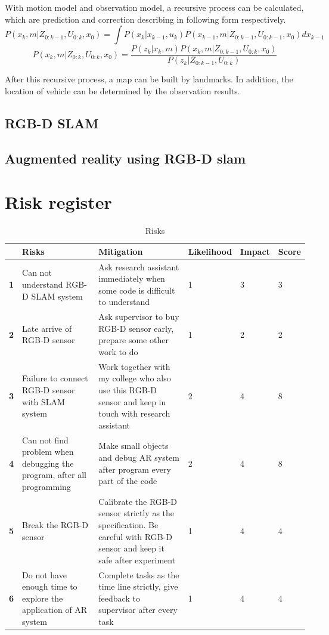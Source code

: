 \documentclass[a4paper,11pt]{article}
\begin{document}
With motion model and observation model, a recursive process can be calculated, which are prediction and correction describing in following form respectively.
\begin{equation}
P(x_k,m | Z_{0:k-1}, U_{0:k}, x_0)=\int P(x_k | x_{k-1}, u_k)P(x_{k-1},m | Z_{0:k-1}, U_{0:k-1}, x_0)dx_{k-1}
\end{equation}
\begin{equation}
P(x_k,m | Z_{0:k}, U_{0:k}, x_0)=\frac{P(z_k | x_k, m)P(x_k,m | Z_{0:k-1}, U_{0:k}, x_0)}{P(z_k | Z_{0:k-1}, U_{0:k})}
\end{equation}

After this recursive process, a map can be built by landmarks. In addition, the location of vehicle can be determined by the observation results.

\subsection{RGB-D SLAM}


\subsection{Augmented reality using RGB-D slam}


\section{Risk register}


\begin{table}[!htp]
\caption{\label{tab:widgets}Risks}
\centering
\begin{tabular}{ | p{0.5cm}| p{4.5cm}|p{4cm} | p{1.9cm}| p{1.2cm} | p{1.2cm} | }

\hline
 &\textbf{Risks}&\textbf{Mitigation}&\textbf{Likelihood}&\textbf{Impact}&\textbf{Score}\\ 
\hline
\textbf{1}&Can not understand RGB-D SLAM system&Ask research assistant immediately when some code is difficult to understand&1&3&3\\ 
\hline
\textbf{2}&Late arrive of RGB-D sensor&Ask supervisor to buy RGB-D sensor early, prepare some other work to do&1&2&2\\ 
\hline
\textbf{3}&Failure to connect RGB-D sensor with SLAM system&Work together with my college who also use this RGB-D sensor and keep in touch with research assistant&2&4&8\\ 
\hline
\textbf{4}&Can not find problem when debugging the program, after all programming&Make small objects and debug AR system after program every part of the code&2&4&8\\ 
\hline
\textbf{5}&Break the RGB-D sensor&Calibrate the RGB-D sensor strictly as the specification. Be careful with RGB-D sensor and keep it safe after experiment &1&4&4\\ 
\hline
\textbf{6}&Do not have enough time to explore the application of AR system&Complete tasks as the time line strictly, give feedback to supervisor after every task &1&4&4\\ 
\hline
\end{tabular}
\end{table}
\end{document}
